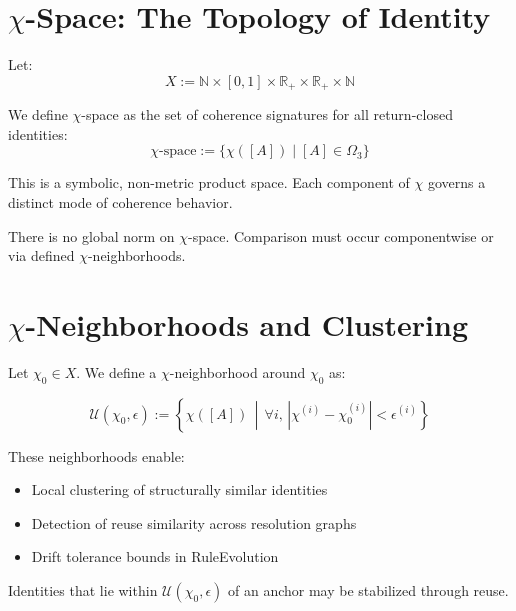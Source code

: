 \section{$\chi$-Space: The Topology of Identity} \label{chi-space-the-topology-of-identity}

Let:
\[
X := \mathbb{N} \times [0,1] \times \mathbb{R}_+ \times \mathbb{R}_+ \times \mathbb{N}
\]

\begin{definition} \label{def:chi-space}
We define $\chi$-space as the set of coherence signatures for all return-closed identities:
\begin{equation} \label{eq:chi-space}
\chi\text{-space} := \{ \chi([A]) \mid [A] \in \Omega_3 \}
\end{equation}
\end{definition}

This is a symbolic, non-metric product space.  
Each component of $\chi$ governs a distinct mode of coherence behavior.

There is no global norm on $\chi$-space.  
Comparison must occur componentwise or via defined $\chi$-neighborhoods.

\section{$\chi$-Neighborhoods and Clustering} \label{chi-neighborhoods-and-clustering}

Let $\chi_0 \in X$.  
We define a $\chi$-neighborhood around $\chi_0$ as:

\begin{definition} \label{def:chi-neighborhood}
\begin{equation} \label{eq:chi-neighborhood}
\mathcal{U}(\chi_0, \epsilon) := \left\{ \chi([A]) \,\middle|\, \forall i,\, \left| \chi^{(i)} - \chi_0^{(i)} \right| < \epsilon^{(i)} \right\}
\end{equation}
\end{definition}

These neighborhoods enable:
\begin{itemize}
  \item Local clustering of structurally similar identities
  \item Detection of reuse similarity across resolution graphs
  \item Drift tolerance bounds in RuleEvolution
\end{itemize}

Identities that lie within $\mathcal{U}(\chi_0, \epsilon)$ of an anchor may be stabilized through reuse.

